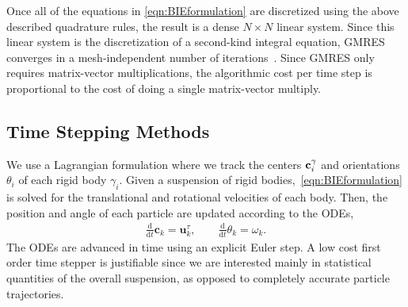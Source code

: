 \documentclass[preprint, 10pt]{elsarticle}
\begin{document}
Once all of the
equations in \eqref{eqn:BIEformulation} are discretized using the above
described
quadrature rules, the result is a dense $N \times N$ linear system.
Since this linear system is the discretization of a second-kind integral
equation, GMRES~\cite{Saad1986} converges in a mesh-independent number of
iterations~\cite{Campbell1996}.  Since GMRES only requires
matrix-vector multiplications, the algorithmic cost per time step is
proportional to the cost of doing a single matrix-vector multiply.


\subsection{Time Stepping Methods}\label{sec:temporal}

We use a Lagrangian formulation where we track the centers
${\mathbf{c}}_i^\gamma$ and orientations $\theta_i$ of each rigid body
$\gamma_i$. Given a suspension of rigid bodies,~\eqref{eqn:BIEformulation} is solved for the translational and rotational velocities of each body. Then, the position and angle of each particle are updated according
to the ODEs,
\begin{align*}
  \frac{\text{d}}{\text{d}t}\mathbf{c}_k = \mathbf{u}^\tau_k, \qquad
  \frac{\text{d}}{\text{d}t}\theta_k =\omega_k.
\end{align*}
The ODEs are advanced in time using an explicit Euler step. A low cost first order time stepper is justifiable since we are interested mainly in statistical quantities of the overall suspension, as opposed to completely accurate particle trajectories. 

\end{document}

